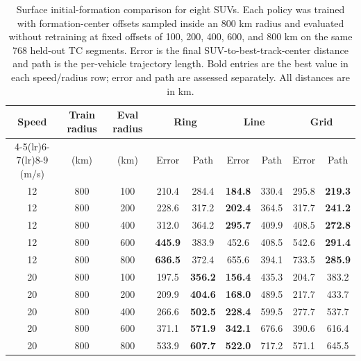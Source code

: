 \begin{table}[t]
\centering
\caption{Surface initial-formation comparison for eight SUVs. Each policy was trained with formation-center offsets sampled inside an 800 km radius and evaluated without retraining at fixed offsets of 100, 200, 400, 600, and 800 km on the same 768 held-out TC segments. Error is the final SUV-to-best-track-center distance and path is the per-vehicle trajectory length. Bold entries are the best value in each speed/radius row; error and path are assessed separately. All distances are in km.}
\label{tab:formation_comparison}
\small
\setlength{\tabcolsep}{2.7pt}
\begin{tabular*}{\textwidth}{@{\extracolsep{\fill}}ccccccccc@{}}
\toprule
Speed & Train radius & Eval radius & \multicolumn{2}{c}{Ring} & \multicolumn{2}{c}{Line} & \multicolumn{2}{c}{Grid} \\
\cmidrule(lr){4-5}\cmidrule(lr){6-7}\cmidrule(lr){8-9}
(m/s) & (km) & (km) & Error & Path & Error & Path & Error & Path \\
\midrule
12 & 800 & 100 & 210.4 & 284.4 & \textbf{184.8} & 330.4 & 295.8 & \textbf{219.3} \\
12 & 800 & 200 & 228.6 & 317.2 & \textbf{202.4} & 364.5 & 317.7 & \textbf{241.2} \\
12 & 800 & 400 & 312.0 & 364.2 & \textbf{295.7} & 409.9 & 408.5 & \textbf{272.8} \\
12 & 800 & 600 & \textbf{445.9} & 383.9 & 452.6 & 408.5 & 542.6 & \textbf{291.4} \\
12 & 800 & 800 & \textbf{636.5} & 372.4 & 655.6 & 394.1 & 733.5 & \textbf{285.9} \\
\midrule
20 & 800 & 100 & 197.5 & \textbf{356.2} & \textbf{156.4} & 435.3 & 204.7 & 383.2 \\
20 & 800 & 200 & 209.9 & \textbf{404.6} & \textbf{168.0} & 489.5 & 217.7 & 433.7 \\
20 & 800 & 400 & 266.6 & \textbf{502.5} & \textbf{228.4} & 599.5 & 277.7 & 537.7 \\
20 & 800 & 600 & 371.1 & \textbf{571.9} & \textbf{342.1} & 676.6 & 390.6 & 616.4 \\
20 & 800 & 800 & 533.9 & \textbf{607.7} & \textbf{522.0} & 717.2 & 571.1 & 645.5 \\
\bottomrule
\end{tabular*}
\end{table}
